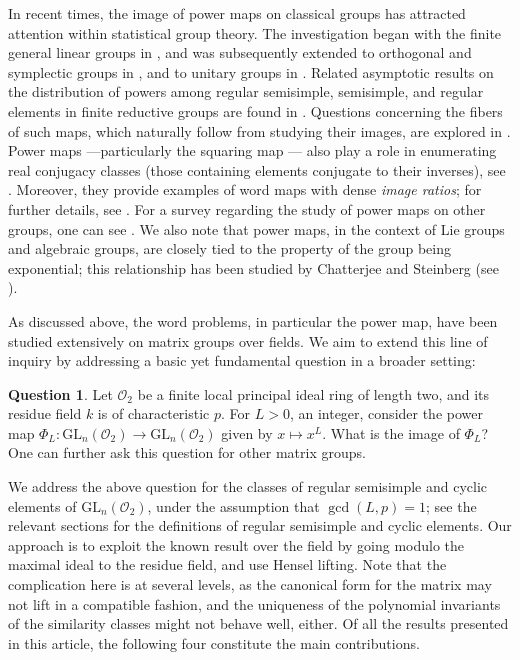 \documentclass[11pt,twoside]{amsart}
\newcommand{\GL}{\mathrm{GL}}
\newcommand{\R}{\mathscr{O}_2}
\theoremstyle{definition} %
\newtheorem{question}{Question}
\begin{document}
In recent times, the image of power maps on classical groups has attracted attention within statistical group theory. The investigation began with the finite general linear groups in \cite{KunduSinghGL}, and was subsequently extended to orthogonal and symplectic groups in \cite{PanjaSinghSymplectic25}, and to unitary groups in \cite{PanjaSinghUnitary24}. Related asymptotic results on the distribution of powers among regular semisimple, semisimple, and regular elements in finite reductive groups are found in \cite{KulshresthaKunduSingh2022}. Questions concerning the fibers of such maps, which naturally follow from studying their images, are explored in \cite{panja2024a}. Power maps —particularly the squaring map — also play a role in enumerating real conjugacy classes (those containing elements conjugate to their inverses), see \cite{panja2024b}. Moreover, they provide examples of word maps with dense \emph{image ratios}; for further details, see \cite{panja2024c}. For a survey regarding the study of power maps on other groups, one can see \cite{PanjaSingh2024Survey}. We also note that power maps, in the context of Lie groups and algebraic groups, are closely tied to the property of the group being exponential; this relationship has been studied by Chatterjee and Steinberg (see \cite{Chatterjee2002,Chatterjee2003,Steinberg2003}).

As discussed above, the word problems, in particular the power map, have been studied extensively on matrix groups over fields. We aim to extend this line of inquiry by addressing a basic yet fundamental question in a broader setting:
\begin{question}
Let $\R$ be a finite local principal ideal ring of length two, and its residue field $k$ is of characteristic $p$. For $L>0$, an integer, consider the power map $\Phi_L \colon \GL_n(\R) \rightarrow \GL_n(\R)$ given by $x \mapsto x^L$. What is the image of $\Phi_L$? One can further ask this question for other matrix groups. 
\end{question}
We address the above question for the classes of regular semisimple and cyclic elements of $\GL_n(\R)$, under the assumption that $\gcd(L, p) = 1$; see the relevant sections for the definitions of regular semisimple and cyclic elements. Our approach is to exploit the known result over the field by going modulo the maximal ideal to the residue field, and use Hensel lifting. Note that the complication here is at several levels, as the canonical form for the matrix may not lift in a compatible fashion, and the uniqueness of the polynomial invariants of the similarity classes might not behave well, either. Of all the results presented in this article, the following four constitute the main contributions.
\end{document}
